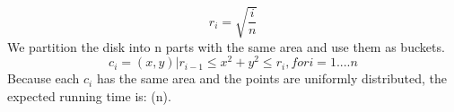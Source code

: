\begin{equation*}
    r_i = \sqrt{\frac{i}{n}}
\end{equation*}
We partition the disk into n parts with the same area and use them as buckets.
\begin{equation*}
    c_i = {(x, y) | r_{i - 1} \leq x^2 + y^2 \leq r_i}, for i = 1....n
\end{equation*}
Because each $c_i$ has the same area and the points are uniformly distributed, the expected running time is: \Theta(n).